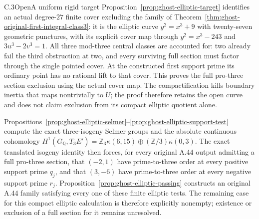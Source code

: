 \begin{result}{C.3}{Open}{A uniform rigid target}
\label{task:ghost-c3}
Proposition~\ref{prop:ghost-elliptic-target} identifies an
actual degree-\(27\) finite cover excluding the family of
Theorem~\ref{thm:ghost-original-first-integral-class3}:
it is the elliptic curve \(y^2=x^3+9\) with twenty-seven
geometric punctures, with its explicit cover map through
\(y^2=x^3-243\) and \(3u^3-2v^3=1\). All three
mod-three central classes are accounted for: two already
fail the third obstruction at two, and every surviving
full section must factor through the single pointed cover.
At the constructed first support prime its ordinary point
has no rational lift to that cover. This proves the full
pro-three section exclusion using the actual cover map.
The compactification kills boundary inertia that maps
nontrivially to \(U\); the proof therefore retains the
open curve and does not claim exclusion from its compact
elliptic quotient alone.

Propositions~\ref{prop:ghost-elliptic-selmer}--\ref{prop:ghost-elliptic-support-test}
compute the exact three-isogeny Selmer groups and the
absolute continuous cohomology
\(H^1(G_{\mathbb Q},T_3E')=\mathbb Z_3\kappa(6,15)
\oplus(\mathbb Z/3)\kappa(0,3)\).
The exact translated isogeny identity then forces, for
every original A.44 output admitting a full pro-three
section, that \((-2,1)\) have prime-to-three order
at every positive support prime \(q_j\), and that
\((3,-6)\) have prime-to-three order at every negative
support prime \(r_j\). Proposition~\ref{prop:ghost-elliptic-passing}
constructs an original A.44 family satisfying every
one of these finite elliptic tests. The remaining case
for this compact elliptic calculation is therefore
explicitly nonempty; existence or exclusion of a full
section for it remains unresolved.


\end{result}

